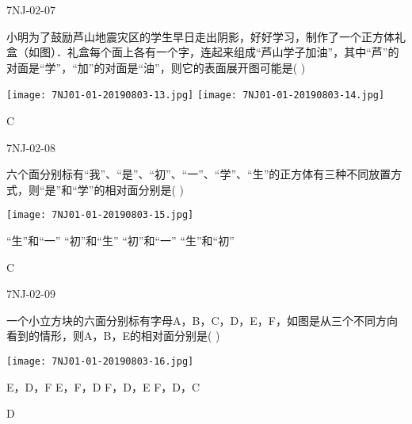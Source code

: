 \begin{defproblem}{7NJ-02-07}%
\begin{onlyproblem}%
小明为了鼓励芦山地震灾区的学生早日走出阴影，好好学习，制作了一个正方体礼盒（如图）．礼盒每个面上各有一个字，连起来组成“芦山学子加油”，其中“芦”的对面是“学”，“加”的对面是“油”，则它的表面展开图可能是(    ) 
\begin{center}
\texttt{[image: 7NJ01-01-20190803-13.jpg]}
\texttt{[image: 7NJ01-01-20190803-14.jpg]}
\end{center}


\end{onlyproblem}%
\begin{onlysolution}%
\begin{solution}%
C
\end{solution}%
\end{onlysolution}%
\end{defproblem}




\begin{defproblem}{7NJ-02-08}%
\begin{onlyproblem}%
六个面分别标有“我”、“是”、“初”、“一”、“学”、“生”的正方体有三种不同放置方式，则“是”和“学”的相对面分别是(    ) 
\begin{center}
\texttt{[image: 7NJ01-01-20190803-15.jpg]}
\end{center}

\xx
{“生”和“一”}
{“初”和“生”}
{“初”和“一”}
{“生”和“初”}   


\end{onlyproblem}%
\begin{onlysolution}%
\begin{solution}%
C
\end{solution}%
\end{onlysolution}%
\end{defproblem}



\begin{defproblem}{7NJ-02-09}%
\begin{onlyproblem}%
一个小立方块的六面分别标有字母A，B，C，D，E，F，如图是从三个不同方向看到的情形，则A，B，E的相对面分别是(    ) 
\begin{center}
\texttt{[image: 7NJ01-01-20190803-16.jpg]}
\end{center}

\xx
{E，D，F}
{E，F，D}
{F，D，E}
{F，D，C}


\end{onlyproblem}%
\begin{onlysolution}%
\begin{solution}%
D
\end{solution}%
\end{onlysolution}%
\end{defproblem}






